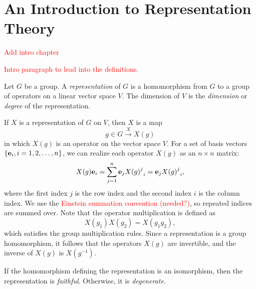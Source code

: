 \chapter{An Introduction to Representation Theory}\label{ch:rep_background}


\textcolor{red}{Add intro chapter}

\textcolor{red}{Intro paragraph to lead into the definitions.}

\begin{definition}
    Let $G$ be a group. A \textit{representation} of $G$ is a homomorphism from $G$ to a group of operators on a linear vector space $V$. The dimension of $V$ is the \textit{dimension} or \textit{degree} of the representation.
\end{definition}

If $X$ is a representation of $G$ on $V$, then $X$ is a map
\begin{equation}
    g\in G\xrightarrow{X} X(g)
\end{equation}
in which $X(g)$ is an operator on the vector space $V$. For a set of basis vectors $\{\mathbf{e}_i,i=1,2,\dots,n\}$, we can realize each operator $X(g)$ as an $n\times n$ matrix:
\begin{equation}
    X(g)\mathbf{e}_i = \sum_{j=1}^n \mathbf{e}_j{{X(g)}^j}_i = \mathbf{e}_j{{X(g)}^j}_i,
\end{equation}
where the first index $j$ is the row index and the second index $i$ is the column index. We use the \textcolor{red}{Einstein summation convention (needed?)}, so repeated indices are summed over. Note that the operator multiplication is defined as
\begin{equation}
    X(g_1)X(g_2) = X(g_1g_2),
\end{equation}
which satisfies the group multiplication rules. Since a representation is a group homomorphism, it follows that the operators $X(g)$ are invertible, and the inverse of $X(g)$ is $X(g^{-1})$.

\begin{definition}
    If the homomorphism defining the representation is an isomorphism, then the representation is \textit{faithful}. Otherwise, it is \textit{degenerate}.
\end{definition}

